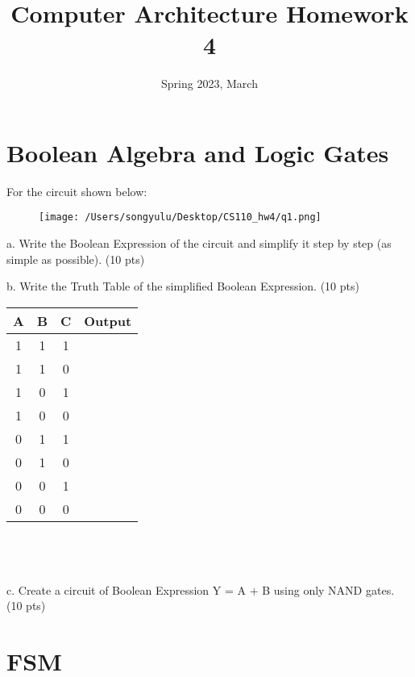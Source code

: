\documentclass{article}
\title{Computer Architecture Homework 4}
\date{Spring 2023, March}
\begin{document}
\maketitle
\setlength{\headsep}{-30pt}
\setlength{\footskip}{100pt}
\section{Boolean Algebra and Logic Gates}
\noindent For the circuit shown below:\par
\begin{figure}[htbp]
	\centering
	\texttt{[image: /Users/songyulu/Desktop/CS110\_hw4/q1.png]}
	\label{fig:1}
\end{figure}
\noindent a. Write the Boolean Expression of the circuit and simplify it step by step (as simple as possible).{\color{red} (10 pts)}

\newpage
\noindent b. Write the Truth Table of the simplified Boolean Expression.{\color{red} (10 pts)}
\begin{table}[h!]
\centering
\setlength{\tabcolsep}{5mm}
\begin{tabular}{|c|c|c|c|}
\hline
A & B & C & Output \\ \hline
1 & 1 & 1 &  \\ \hline
1 & 1 & 0 &  \\ \hline
1 & 0 & 1 &  \\ \hline
1 & 0 & 0 &  \\ \hline
0 & 1 & 1 &  \\ \hline
0 & 1 & 0 &  \\ \hline
0 & 0 & 1 &  \\ \hline
0 & 0 & 0 &  \\ \hline
\end{tabular}
\end{table}
~\\
~\\
~\\

\noindent c. Create a circuit of Boolean Expression Y = A + B using only NAND gates.{\color{red} (10 pts)}


\newpage

\section{FSM}
\end{document}
